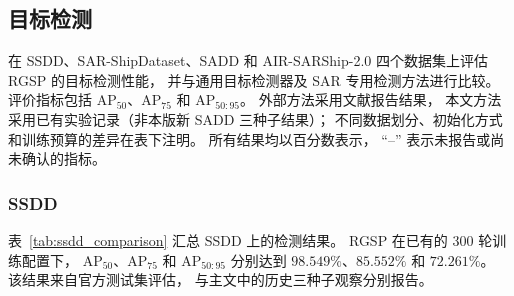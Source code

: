 \subsection{目标检测}
\label{sec:detection_results}

在 SSDD、SAR-ShipDataset、SADD 和 AIR-SARShip-2.0
四个数据集上评估 RGSP 的目标检测性能，
并与通用目标检测器及 SAR 专用检测方法进行比较。
评价指标包括 AP$_{50}$、AP$_{75}$ 和 AP$_{50:95}$。
外部方法采用文献报告结果，
本文方法采用已有实验记录（非本版新 SADD 三种子结果）；
不同数据划分、初始化方式和训练预算的差异在表下注明。
所有结果均以百分数表示，
``--'' 表示未报告或尚未确认的指标。

\subsubsection{SSDD}
\label{sec:ssdd_results}

表~\ref{tab:ssdd_comparison}
汇总 SSDD 上的检测结果。
RGSP 在已有的 300 轮训练配置下，
AP$_{50}$、AP$_{75}$ 和 AP$_{50:95}$
分别达到 $98.549\%$、$85.552\%$ 和 $72.261\%$。
该结果来自官方测试集评估，
与主文中的历史三种子观察分别报告。

